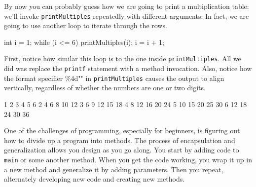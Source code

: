 \documentclass[12pt]{book}
\makeatletter
\theoremstyle{exercise}
\newcommand{\java}[1]{\verb"#1"}
\renewcommand{\section}{\@startsection {section}{1}{\z@}%
    {-3.5ex \@plus -1ex \@minus -.2ex}%
    {0.7ex \@plus.2ex}%
    {\normalfont\Large\bfseries}}
\newcommand{\java}[1]{\lstinline{#1}} %
\makeatother
\begin{document}
By now you can probably guess how we are going to print a multiplication table: we'll invoke \java{printMultiples} repeatedly with different arguments.
In fact, we are going to use another loop to iterate through the rows.

\begin{code}
    int i = 1;
    while (i <= 6) {
        printMultiples(i);
        i = i + 1;
    }
\end{code}

First, notice how similar this loop is to the one inside \java{printMultiples}.
All we did was replace the \java{printf} statement with a method invocation.
Also, notice how the format specifier \java{"\%4d"} in \java{printMultiples} causes the output to align vertically, regardless of whether the numbers are one or two digits.

\begin{stdout}
    1    2    3    4    5    6
    2    4    6    8   10   12
    3    6    9   12   15   18
    4    8   12   16   20   24
    5   10   15   20   25   30
    6   12   18   24   30   36
\end{stdout}

%
%

One of the challenges of programming, especially for beginners, is figuring out how to divide up a program into methods.
The process of encapsulation and generalization allows you design as you go along.
You start by adding code to \java{main} or some another method.
When you get the code working, you wrap it up in a new method and generalize it by adding parameters.
Then you repeat, alternately developing new code and creating new methods.
\end{document}
